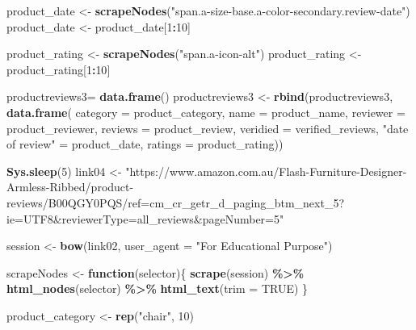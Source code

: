 \documentclass[
]{article}
\newenvironment{Shaded}{\begin{snugshade}}{\end{snugshade}}
\newcommand{\AttributeTok}[1]{\textcolor[rgb]{0.13,0.29,0.53}{#1}}
\newcommand{\ConstantTok}[1]{\textcolor[rgb]{0.56,0.35,0.01}{#1}}
\newcommand{\ControlFlowTok}[1]{\textcolor[rgb]{0.13,0.29,0.53}{\textbf{#1}}}
\newcommand{\DecValTok}[1]{\textcolor[rgb]{0.00,0.00,0.81}{#1}}
\newcommand{\FunctionTok}[1]{\textcolor[rgb]{0.13,0.29,0.53}{\textbf{#1}}}
\newcommand{\NormalTok}[1]{#1}
\newcommand{\OtherTok}[1]{\textcolor[rgb]{0.56,0.35,0.01}{#1}}
\newcommand{\SpecialCharTok}[1]{\textcolor[rgb]{0.81,0.36,0.00}{\textbf{#1}}}
\newcommand{\StringTok}[1]{\textcolor[rgb]{0.31,0.60,0.02}{#1}}
\begin{document}
\begin{Shaded}
\begin{Highlighting}[]
\NormalTok{  product\_date }\OtherTok{\textless{}{-}} \FunctionTok{scrapeNodes}\NormalTok{(}\StringTok{"span.a{-}size{-}base.a{-}color{-}secondary.review{-}date"}\NormalTok{)}
\NormalTok{  product\_date }\OtherTok{\textless{}{-}}\NormalTok{ product\_date[}\DecValTok{1}\SpecialCharTok{:}\DecValTok{10}\NormalTok{]}
  
\NormalTok{  product\_rating }\OtherTok{\textless{}{-}} \FunctionTok{scrapeNodes}\NormalTok{(}\StringTok{"span.a{-}icon{-}alt"}\NormalTok{)}
\NormalTok{  product\_rating }\OtherTok{\textless{}{-}}\NormalTok{ product\_rating[}\DecValTok{1}\SpecialCharTok{:}\DecValTok{10}\NormalTok{]}
  
\NormalTok{  productreviews3}\OtherTok{=} \FunctionTok{data.frame}\NormalTok{()}
\NormalTok{  productreviews3 }\OtherTok{\textless{}{-}} \FunctionTok{rbind}\NormalTok{(productreviews3, }\FunctionTok{data.frame}\NormalTok{(}
                      \AttributeTok{category =}\NormalTok{ product\_category,}
                      \AttributeTok{name =}\NormalTok{ product\_name,}
                      \AttributeTok{reviewer =}\NormalTok{ product\_reviewer,}
                      \AttributeTok{reviews =}\NormalTok{ product\_review,}
                      \AttributeTok{veridied =}\NormalTok{ verified\_reviews,}
                      \StringTok{"date of review"} \OtherTok{=}\NormalTok{ product\_date,}
                      \AttributeTok{ratings =}\NormalTok{ product\_rating))}
  
   \FunctionTok{Sys.sleep}\NormalTok{(}\DecValTok{5}\NormalTok{)}
\NormalTok{link04 }\OtherTok{\textless{}{-}} \StringTok{"https://www.amazon.com.au/Flash{-}Furniture{-}Designer{-}Armless{-}Ribbed/product{-}reviews/B00QGY0PQS/ref=cm\_cr\_getr\_d\_paging\_btm\_next\_5?ie=UTF8\&reviewerType=all\_reviews\&pageNumber=5"}


\NormalTok{  session }\OtherTok{\textless{}{-}} \FunctionTok{bow}\NormalTok{(link02,}
               \AttributeTok{user\_agent =} \StringTok{"For Educational Purpose"}\NormalTok{)}

\NormalTok{  scrapeNodes }\OtherTok{\textless{}{-}} \ControlFlowTok{function}\NormalTok{(selector)\{}
    \FunctionTok{scrape}\NormalTok{(session) }\SpecialCharTok{\%\textgreater{}\%}
      \FunctionTok{html\_nodes}\NormalTok{(selector) }\SpecialCharTok{\%\textgreater{}\%}
      \FunctionTok{html\_text}\NormalTok{(}\AttributeTok{trim =} \ConstantTok{TRUE}\NormalTok{)}
\NormalTok{  \}}

\NormalTok{  product\_category }\OtherTok{\textless{}{-}} \FunctionTok{rep}\NormalTok{(}\StringTok{"chair"}\NormalTok{, }\DecValTok{10}\NormalTok{)}


\end{Highlighting}
\end{Shaded}
\end{document}
